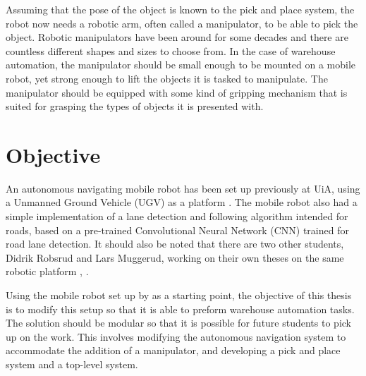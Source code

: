 Assuming that the pose of the object is known to the pick and place system, the robot now needs a robotic arm, often called a manipulator, to be able to pick the object. Robotic manipulators have been around for some decades and there are countless different shapes and sizes to choose from. In the case of warehouse automation, the manipulator should be small enough to be mounted on a mobile robot, yet strong enough to lift the objects it is tasked to manipulate. The manipulator should be equipped with some kind of gripping mechanism that is suited for grasping the types of objects it is presented with.


\section{Objective} \label{sec:I:Objective}
An autonomous navigating mobile robot has been set up previously at UiA, using a Unmanned Ground Vehicle (UGV) as a platform \cite{MAS513Rep}. The mobile robot also had a simple implementation of a lane detection and following algorithm intended for roads, based on a pre-trained Convolutional Neural Network (CNN) trained for road lane detection. It should also be noted that there are two other students, Didrik Robsrud and Lars Muggerud, working on their own theses on the same robotic platform \cite{robsrud2023}, \cite{muggerud2023}. 

Using the mobile robot set up by \cite{MAS513Rep} as a starting point, the objective of this thesis is to modify this setup so that it is able to preform warehouse automation tasks. The solution should be modular so that it is possible for future students to pick up on the work. This involves modifying the autonomous navigation system to accommodate the addition of a manipulator, and developing a pick and place system and a top-level system.

